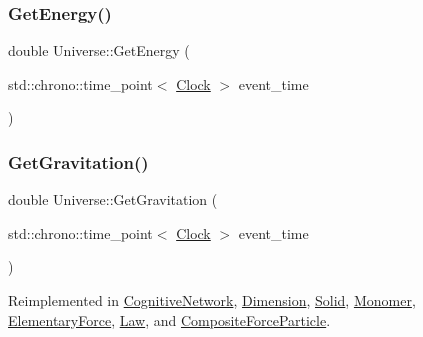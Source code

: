 \mbox{\label{classUniverse_a3b25e7ce6552991b7d5e6a9eb6e8a7ff}} 
\subsubsection{\texorpdfstring{Get\+Energy()}{GetEnergy()}}
{\footnotesize\ttfamily double Universe\+::\+Get\+Energy (\begin{DoxyParamCaption}\item[{std\+::chrono\+::time\+\_\+point$<$ \mbox{\hyperlink{universe_8h_a0ef8d951d1ca5ab3cfaf7ab4c7a6fd80}{Clock}} $>$}]{event\+\_\+time }\end{DoxyParamCaption})}

\mbox{\label{classUniverse_ab0404e774ee0ed66b597ff5b8e989446}} 
\subsubsection{\texorpdfstring{Get\+Gravitation()}{GetGravitation()}}
{\footnotesize\ttfamily double Universe\+::\+Get\+Gravitation (\begin{DoxyParamCaption}\item[{std\+::chrono\+::time\+\_\+point$<$ \mbox{\hyperlink{universe_8h_a0ef8d951d1ca5ab3cfaf7ab4c7a6fd80}{Clock}} $>$}]{event\+\_\+time }\end{DoxyParamCaption})\hspace{0.3cm}{\ttfamily [virtual]}}



Reimplemented in \mbox{\hyperlink{classCognitiveNetwork_a4b5150310288c52f00ecb745ae9e7f86}{Cognitive\+Network}}, \mbox{\hyperlink{classDimension_a652220a2eb1b26c749ad032865d81788}{Dimension}}, \mbox{\hyperlink{classSolid_ab5ecb5598be93fe3cd2a21c0cfd363c8}{Solid}}, \mbox{\hyperlink{classMonomer_aa5f7b901e15c9a9eb6e1c3564cd06e4f}{Monomer}}, \mbox{\hyperlink{classElementaryForce_a579afb8079668f0587096934d1de9c04}{Elementary\+Force}}, \mbox{\hyperlink{classLaw_a84bdc0c2ca97a9c19422018ff761b992}{Law}}, and \mbox{\hyperlink{classCompositeForceParticle_a06483dc73c156679f34acf85aa5f924e}{Composite\+Force\+Particle}}.

\mbox{\label{classUniverse_a69de663cf2e32e65ed28c44ae666db3a}} 
